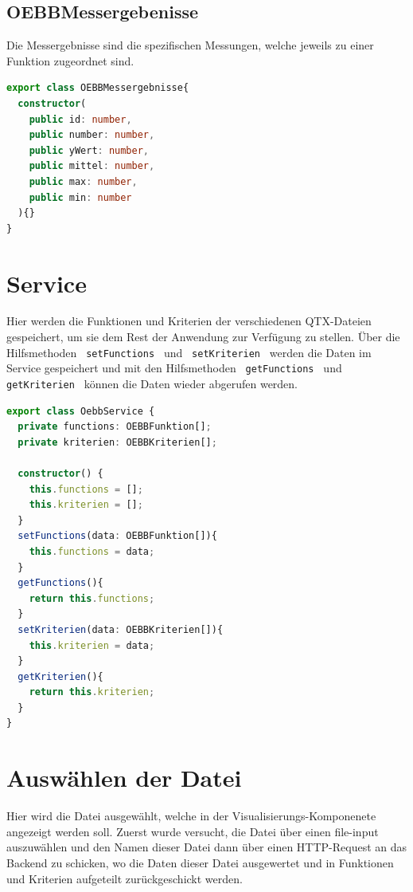 \subsection{OEBBMessergebenisse}
Die Messergebnisse sind die spezifischen Messungen, welche jeweils zu einer Funktion zugeordnet sind. 

\begin{lstlisting}[language=Typescript, caption={OEBB-Messergebnisse}]
export class OEBBMessergebnisse{
  constructor(
    public id: number,
    public number: number,
    public yWert: number,
    public mittel: number,
    public max: number,
    public min: number
  ){}
}
\end{lstlisting}

\section{Service} \label{service}
Hier werden die Funktionen und Kriterien der verschiedenen QTX-Dateien gespeichert, um sie dem Rest der Anwendung zur Verfügung zu 
stellen. Über die Hilfsmethoden \lstinline | setFunctions | und \lstinline | setKriterien | werden die Daten im Service gespeichert
und mit den Hilfsmethoden \lstinline | getFunctions | und \lstinline | getKriterien | können die Daten wieder abgerufen werden.

\begin{lstlisting}[language=Typescript, caption={OEBB-Service}]
export class OebbService {
  private functions: OEBBFunktion[];
  private kriterien: OEBBKriterien[];

  constructor() {
    this.functions = [];
    this.kriterien = [];
  }
  setFunctions(data: OEBBFunktion[]){
    this.functions = data;
  }
  getFunctions(){
    return this.functions;
  }
  setKriterien(data: OEBBKriterien[]){
    this.kriterien = data;
  }
  getKriterien(){
    return this.kriterien;
  }
}
\end{lstlisting}

\section{Auswählen der Datei} \label{auswahlkomponente}
Hier wird die Datei ausgewählt, welche in der Visualisierungs-Komponenete angezeigt werden soll. Zuerst wurde versucht, die Datei 
über einen file-input auszuwählen und den Namen dieser Datei dann über einen HTTP-Request an das Backend zu schicken, wo die Daten
dieser Datei ausgewertet und in Funktionen und Kriterien aufgeteilt zurückgeschickt werden. 

